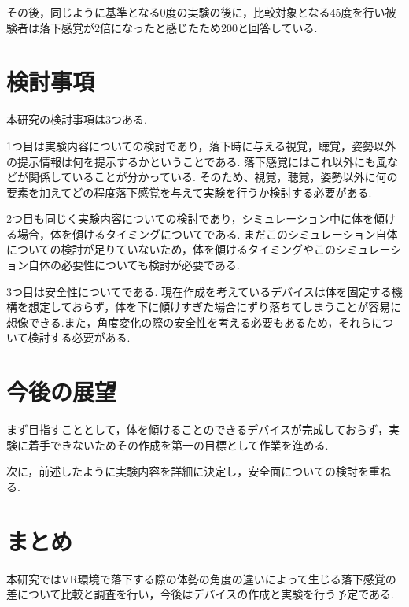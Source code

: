 \documentclass[uplatex]{jsarticle}
\begin{document}
その後，同じように基準となる0度の実験の後に，比較対象となる45度を行い被験者は落下感覚が2倍になったと感じたため200と回答している.

\section{検討事項}
本研究の検討事項は3つある.

1つ目は実験内容についての検討であり，落下時に与える視覚，聴覚，姿勢以外の提示情報は何を提示するかということである.
落下感覚にはこれ以外にも風などが関係していることが分かっている\cite{青木誠也2018音と風によって浮遊感を感じさせる装置の制作}.
そのため、視覚，聴覚，姿勢以外に何の要素を加えてどの程度落下感覚を与えて実験を行うか検討する必要がある.

2つ目も同じく実験内容についての検討であり，シミュレーション中に体を傾ける場合，体を傾けるタイミングについてである.
まだこのシミュレーション自体についての検討が足りていないため，体を傾けるタイミングやこのシミュレーション自体の必要性についても検討が必要である.

3つ目は安全性についてである.
現在作成を考えているデバイスは体を固定する機構を想定しておらず，体を下に傾けすぎた場合にずり落ちてしまうことが容易に想像できる.また，角度変化の際の安全性を考える必要もあるため，それらについて検討する必要がある.

\section{今後の展望}
まず目指すこととして，体を傾けることのできるデバイスが完成しておらず，実験に着手できないためその作成を第一の目標として作業を進める.

次に，前述したように実験内容を詳細に決定し，安全面についての検討を重ねる.

\section{まとめ}
本研究ではVR環境で落下する際の体勢の角度の違いによって生じる落下感覚の差について比較と調査を行い，今後はデバイスの作成と実験を行う予定である.


 
\end{document}
